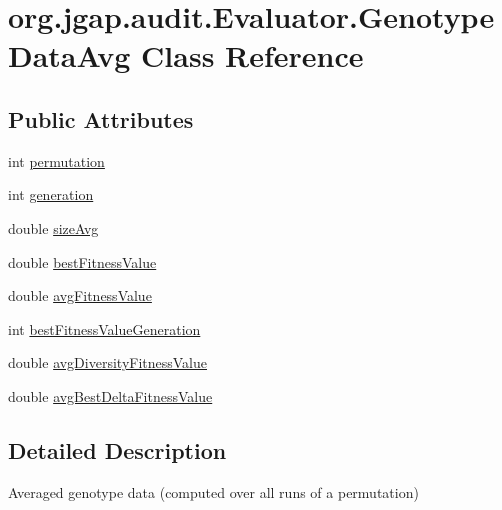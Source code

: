 \hypertarget{classorg_1_1jgap_1_1audit_1_1_evaluator_1_1_genotype_data_avg}{\section{org.\-jgap.\-audit.\-Evaluator.\-Genotype\-Data\-Avg Class Reference}
\label{classorg_1_1jgap_1_1audit_1_1_evaluator_1_1_genotype_data_avg}
}
\subsection*{Public Attributes}
\begin{DoxyCompactItemize}
\item 
int \hyperlink{classorg_1_1jgap_1_1audit_1_1_evaluator_1_1_genotype_data_avg_a3b75f5017889ef77065a0644c5c4fbdc}{permutation}
\item 
int \hyperlink{classorg_1_1jgap_1_1audit_1_1_evaluator_1_1_genotype_data_avg_aad230ff5a2d3d6dc0b9ac23c6a1bf32b}{generation}
\item 
double \hyperlink{classorg_1_1jgap_1_1audit_1_1_evaluator_1_1_genotype_data_avg_af4a68ef049ea087ebb69f303af4761bb}{size\-Avg}
\item 
double \hyperlink{classorg_1_1jgap_1_1audit_1_1_evaluator_1_1_genotype_data_avg_af98cfaad062810bd7a9b4759d363128c}{best\-Fitness\-Value}
\item 
double \hyperlink{classorg_1_1jgap_1_1audit_1_1_evaluator_1_1_genotype_data_avg_a61898ecfddac9b306c817b4da2bb15cf}{avg\-Fitness\-Value}
\item 
int \hyperlink{classorg_1_1jgap_1_1audit_1_1_evaluator_1_1_genotype_data_avg_a4fcaa038aa8e18dce9dac4a18d12ee36}{best\-Fitness\-Value\-Generation}
\item 
double \hyperlink{classorg_1_1jgap_1_1audit_1_1_evaluator_1_1_genotype_data_avg_abddaf3378c5c0823b44bdcf3d48cfe5e}{avg\-Diversity\-Fitness\-Value}
\item 
double \hyperlink{classorg_1_1jgap_1_1audit_1_1_evaluator_1_1_genotype_data_avg_a8de77e171d9d124e7598129b75a47cf7}{avg\-Best\-Delta\-Fitness\-Value}
\end{DoxyCompactItemize}


\subsection{Detailed Description}
Averaged genotype data (computed over all runs of a permutation)

